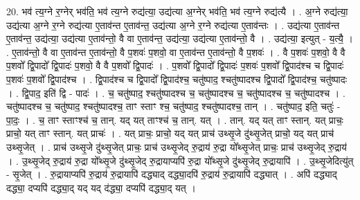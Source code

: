 \documentclass[17pt]{extarticle}
\begin{document}
20. भव॑ त्य॒ग्ने र॒ग्नेर् भव॑ति॒ भव॑ त्य॒ग्ने रुद्य॑त्या॒ उद्य॑त्या अ॒ग्नेर् भव॑ति॒ भव॑ त्य॒ग्ने रुद्य॑त्यै । . अ॒ग्ने रुद्य॑त्या॒ उद्य॑त्या अ॒ग्ने र॒ग्ने रुद्य॑त्या ए॒ताव॑न्त ए॒ताव॑न्त॒ उद्य॑त्या अ॒ग्ने र॒ग्ने रुद्य॑त्या ए॒ताव॑न्तः । . उद्य॑त्या ए॒ताव॑न्त ए॒ताव॑न्त॒ उद्य॑त्या॒ उद्य॑त्या ए॒ताव॑न्तो॒ वै वा ए॒ताव॑न्त॒ उद्य॑त्या॒ उद्य॑त्या ए॒ताव॑न्तो॒ वै । . उद्य॑त्या॒ इत्युत् - य॒त्यै॒ । . ए॒ताव॑न्तो॒ वै वा ए॒ताव॑न्त ए॒ताव॑न्तो॒ वै प॒शवः॑ प॒शवो॒ वा ए॒ताव॑न्त ए॒ताव॑न्तो॒ वै प॒शवः॑ । . वै प॒शवः॑ प॒शवो॒ वै वै प॒शवो᳚ द्वि॒पादो᳚ द्वि॒पादः॑ प॒शवो॒ वै वै प॒शवो᳚ द्वि॒पादः॑ । . प॒शवो᳚ द्वि॒पादो᳚ द्वि॒पादः॑ प॒शवः॑ प॒शवो᳚ द्वि॒पाद॑श्च च द्वि॒पादः॑ प॒शवः॑ प॒शवो᳚ द्वि॒पाद॑श्च । . द्वि॒पाद॑श्च च द्वि॒पादो᳚ द्वि॒पाद॑श्च॒ चतु॑ष्पाद॒ श्चतु॑ष्पादश्च द्वि॒पादो᳚ द्वि॒पाद॑श्च॒ चतु॑ष्पादः । . द्वि॒पाद॒ इति॑ द्वि - पादः॑ । . च॒ चतु॑ष्पाद॒ श्चतु॑ष्पादश्च च॒ चतु॑ष्पादश्च च॒ चतु॑ष्पादश्च च॒ चतु॑ष्पादश्च । . चतु॑ष्पादश्च च॒ चतु॑ष्पाद॒ श्चतु॑ष्पादश्च॒ ताꣳ स्ताꣳ श्च॒ चतु॑ष्पाद॒ श्चतु॑ष्पादश्च॒ तान् । . चतु॑ष्पाद॒ इति॒ चतुः॑ - पा॒दः॒ । . च॒ ताꣳ स्ताꣳश्च॑ च॒ तान्. यद् यत् ताꣳश्च॑ च॒ तान्. यत् । . तान्. यद् यत् ताꣳ स्तान्. यत् प्राचः॒ प्राचो॒ यत् ताꣳ स्तान्. यत् प्राचः॑ । . यत् प्राचः॒ प्राचो॒ यद् यत् प्राच॑ उथ्सृ॒जे दु॑थ्सृ॒जेत् प्राचो॒ यद् यत् प्राच॑ उथ्सृ॒जेत् । . प्राच॑ उथ्सृ॒जे दु॑थ्सृ॒जेत् प्राचः॒ प्राच॑ उथ्सृ॒जेद् रु॒द्राय॑ रु॒द्रा यो᳚थ्सृ॒जेत् प्राचः॒ प्राच॑ उथ्सृ॒जेद् रु॒द्राय॑ । . उ॒थ्सृ॒जेद् रु॒द्राय॑ रु॒द्रा यो᳚थ्सृ॒जे दु॑थ्सृ॒जेद् रु॒द्रायाप्यपि॑ रु॒द्रा यो᳚थ्सृ॒जे दु॑थ्सृ॒जेद् रु॒द्रायापि॑ । . उ॒थ्सृ॒जेदित्यु॑त् - सृ॒जेत् । . रु॒द्रायाप्यपि॑ रु॒द्राय॑ रु॒द्रायापि॑ दद्ध्याद् दद्ध्या॒दपि॑ रु॒द्राय॑ रु॒द्रायापि॑ दद्ध्यात् । . अपि॑ दद्ध्याद् दद्ध्या॒ दप्यपि॑ दद्ध्या॒द् यद् यद् द॑द्ध्या॒ दप्यपि॑ दद्ध्या॒द् यत् । \newline
\end{document}
